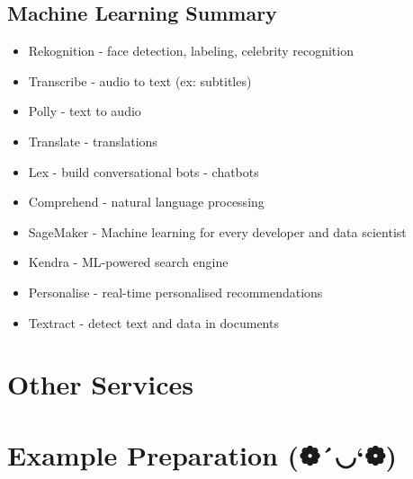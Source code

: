 \documentclass[11pt]{article}
\begin{document}
    \section{Machine Learning Summary}

    \begin{itemize}
        \item Rekognition - face detection, labeling, celebrity recognition
        \item Transcribe - audio to text (ex: subtitles)
        \item Polly - text to audio
        \item Translate - translations
        \item Lex - build conversational bots - chatbots
        \item Comprehend - natural language processing
        \item SageMaker - Machine learning for every developer and data scientist
        \item Kendra - ML-powered search engine
        \item Personalise - real-time personalised recommendations
        \item Textract - detect text and data in documents
    \end{itemize}

    \chapter{Other Services}
    \chapter{Example Preparation (❁´◡`❁)}
\end{document}

